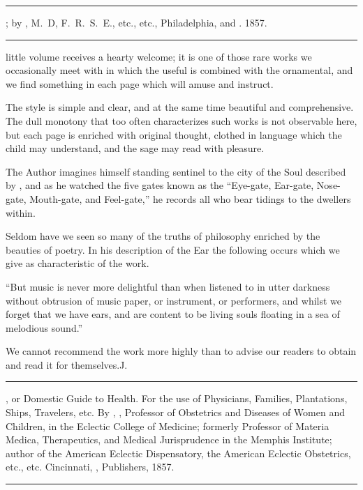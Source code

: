 
\fancybreak{* * *}
\footnotesize
{}; by , M.~D, F.~R.~S.~E., etc., etc.,
Philadelphia,  and . 1857.
\plainbreak{1}
\normalsize

 little volume receives a hearty welcome; it is one of those rare
works we occasionally meet with in which the useful is combined
with the ornamental, and we find something in each page which will
amuse and instruct.

The style is simple and clear, and at the same time beautiful and
comprehensive. The dull monotony that too often characterizes such
works is not observable here, but each page is enriched with original
thought, clothed in language which the child may understand, and the
sage may read with pleasure.

The Author imagines himself standing sentinel to the city of the Soul
described by , and as he watched the five gates known
as the ``Eye-gate, Ear-gate, Nose-gate, Mouth-gate, and Feel-gate,'' he
records all who bear tidings to the dwellers within.

Seldom have we seen so many of the truths of philosophy enriched
by the beauties of poetry. In his description of the Ear the following
occurs which we give as characteristic of the work.

``But music is never more delightful than when listened to in utter
darkness without obtrusion of music paper, or instrument, or performers,
and whilst we forget that we have ears, and are content to be living
souls floating in a sea of melodious sound.''

We cannot recommend the work more highly than to advise our readers
to obtain and read it for themselves.\hfill{}J.\quad{}

\fancybreak{* * *}

, or Domestic Guide to Health. For the use of Physicians,
Families, Plantations, Ships, Travelers, etc. By , \md, Professor of
Obstetrics and Diseases of Women and Children, in the Eclectic College of Medicine;
formerly Professor of Materia Medica, Therapeutics, and Medical Jurisprudence in the
Memphis Institute; author of the American Eclectic Dispensatory, the American
Eclectic Obstetrics, etc., etc. Cincinnati, , Publishers, 1857.
\plainbreak{1}
\normalsize

